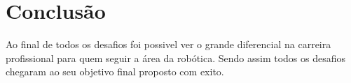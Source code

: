 \chapter{Conclusão}
\label{chap:conc}

Ao final de todos os desafios foi possivel ver o grande diferencial na carreira profissional para quem seguir a área da robótica.
Sendo assim todos os desafios chegaram ao seu objetivo final proposto com exito.




